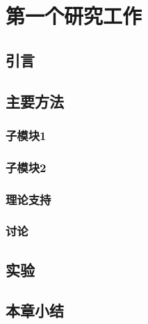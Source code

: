 \chapter{第一个研究工作}
\section{引言}

\section{主要方法}
\subsection{子模块1}
\subsection{子模块2}
\subsection{理论支持}
\subsection{讨论}

\section{实验}

\section{本章小结}
